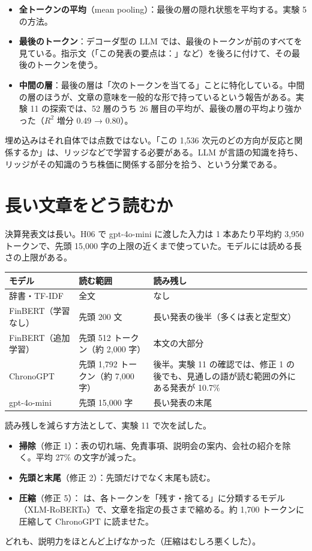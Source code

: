 \begin{itemize}
\item \textbf{全トークンの平均}（mean pooling）：最後の層の隠れ状態を平均する。実験 5 の方法。
\item \textbf{最後のトークン}：デコーダ型の LLM では、最後のトークンが前のすべてを見ている。指示文（「この発表の要点は：」など）を後ろに付けて、その最後のトークンを使う。
\item \textbf{中間の層}：最後の層は「次のトークンを当てる」ことに特化している。中間の層のほうが、文章の意味を一般的な形で持っているという報告がある。実験 11 の探索では、52 層のうち 26 層目の平均が、最後の層の平均より強かった（$R^2$ 増分 0.49 → 0.80）。
\end{itemize}

埋め込みはそれ自体では点数ではない。「この 1,536 次元のどの方向が反応と関係するか」は、リッジなどで学習する必要がある。LLM が言語の知識を持ち、リッジがその知識のうち株価に関係する部分を拾う、という分業である。

\section{長い文章をどう読むか}

決算発表文は長い。H06 で gpt-4o-mini に渡した入力は 1 本あたり平均約 3,950 トークンで、先頭 15,000 字の上限の近くまで使っていた。モデルには読める長さの上限がある。

\begin{longtable}{P{3.4cm}P{3.6cm}P{7.4cm}}
\toprule
\textbf{モデル} & \textbf{読む範囲} & \textbf{読み残し} \\
\midrule
\endhead
\bottomrule
\endfoot
辞書・TF-IDF & 全文 & なし \\
FinBERT（学習なし） & 先頭 200 文 & 長い発表の後半（多くは表と定型文） \\
FinBERT（追加学習） & 先頭 512 トークン（約 2,000 字） & 本文の大部分 \\
ChronoGPT & 先頭 1,792 トークン（約 7,000 字） & 後半。実験 11 の確認では、修正 1 の後でも、見通しの語が読む範囲の外にある発表が 10.7\% \\
gpt-4o-mini & 先頭 15,000 字 & 長い発表の末尾 \\
\end{longtable}

読み残しを減らす方法として、実験 11 で次を試した。
\begin{itemize}
\item \textbf{掃除}（修正 1）：表の切れ端、免責事項、説明会の案内、会社の紹介を除く。平均 27\% の文字が減った。
\item \textbf{先頭と末尾}（修正 2）：先頭だけでなく末尾も読む。
\item \textbf{圧縮}（修正 5）： は、各トークンを「残す・捨てる」に分類するモデル（XLM-RoBERTa）で、文章を指定の長さまで縮める。約 1,700 トークンに圧縮して ChronoGPT に読ませた。
\end{itemize}
どれも、説明力をほとんど上げなかった（圧縮はむしろ悪くした）。

